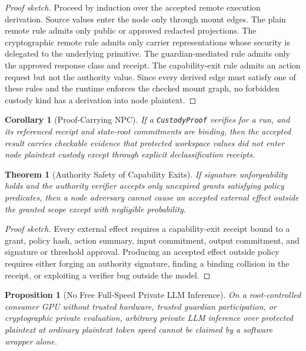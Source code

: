 \documentclass[11pt]{article}
\newtheorem{theorem}{Theorem}
\newtheorem{proposition}{Proposition}
\newtheorem{corollary}{Corollary}
\newcommand{\code}[1]{\texttt{#1}}
\begin{document}
\begin{proof}[Proof sketch]
Proceed by induction over the accepted remote execution derivation. Source
values enter the node only through mount edges. The plain remote rule admits
only public or approved redacted projections. The cryptographic remote rule
admits only carrier representations whose security is delegated to the
underlying primitive. The guardian-mediated rule admits only the approved
response class and receipt. The capability-exit rule admits an action request
but not the authority value. Since every derived edge must satisfy one of these
rules and the runtime enforces the checked mount graph, no forbidden custody
kind has a derivation into node plaintext.
\end{proof}

\begin{corollary}[Proof-Carrying NPC]
If a \code{CustodyProof} verifies for a run, and its referenced receipt and
state-root commitments are binding, then the accepted result carries checkable
evidence that protected workspace values did not enter node plaintext custody
except through explicit declassification receipts.
\end{corollary}

\begin{theorem}[Authority Safety of Capability Exits]
If signature unforgeability holds and the authority verifier accepts only
unexpired grants satisfying policy predicates, then a node adversary cannot
cause an accepted external effect outside the granted scope except with
negligible probability.
\end{theorem}

\begin{proof}[Proof sketch]
Every external effect requires a capability-exit receipt bound to a grant,
policy hash, action summary, input commitment, output commitment, and signature
or threshold approval. Producing an accepted effect outside policy requires
either forging an authority signature, finding a binding collision in the
receipt, or exploiting a verifier bug outside the model.
\end{proof}

\begin{proposition}[No Free Full-Speed Private LLM Inference]
On a root-controlled consumer GPU without trusted hardware, trusted guardian
participation, or cryptographic private evaluation, arbitrary private LLM
inference over protected plaintext at ordinary plaintext token speed cannot be
claimed by a software wrapper alone.
\end{proposition}
\end{document}

